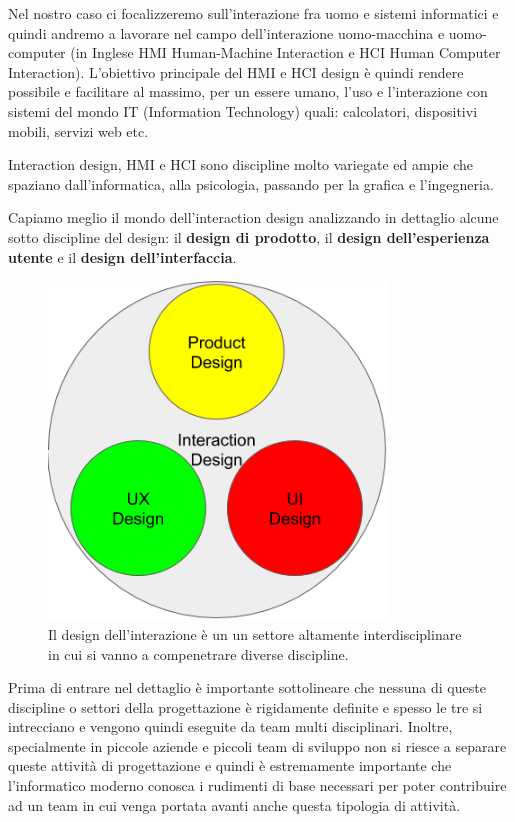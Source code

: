 
Nel nostro caso ci focalizzeremo sull'interazione fra uomo e sistemi informatici e quindi andremo a lavorare nel campo dell'interazione uomo-macchina e uomo-computer (in Inglese HMI Human-Machine Interaction e HCI Human Computer Interaction). L'obiettivo principale del HMI e HCI design è quindi rendere possibile e facilitare al massimo, per un essere umano, l'uso e l'interazione con sistemi del mondo IT (Information Technology) quali: calcolatori, dispositivi mobili, servizi web etc.

Interaction design, HMI e HCI sono discipline molto variegate ed ampie che spaziano dall'informatica, alla psicologia, passando per la grafica e l'ingegneria. 

Capiamo meglio il mondo dell'interaction design analizzando in dettaglio alcune sotto discipline del design: il \textbf{design di prodotto}, il \textbf{design dell'esperienza utente} e il \textbf{design dell'interfaccia}. 


\begin{figure}[!h]
	\centering
	\includegraphics[width=0.8\textwidth]{immagini/interactiondesign2.png}
	\caption{Il design dell'interazione è un un settore altamente interdisciplinare in cui si vanno a compenetrare diverse discipline.}
\end{figure}

Prima di entrare nel dettaglio è importante sottolineare che nessuna di queste discipline o settori della progettazione è rigidamente definite e spesso le tre si intrecciano e vengono quindi eseguite da team multi disciplinari. Inoltre, specialmente in piccole aziende e piccoli team di sviluppo non si riesce a separare queste attività di progettazione e quindi è estremamente importante che l'informatico moderno conosca i rudimenti di base necessari per poter contribuire ad un team in cui venga portata avanti anche questa tipologia di attività.


